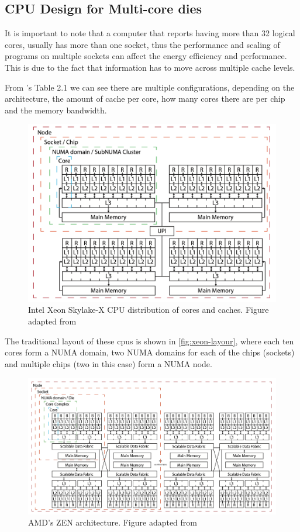 \subsection{CPU Design for Multi-core dies}
It is important to note that a computer that reports having more than 32 logical cores, usually has more than one socket, thus the performance and scaling of programs on multiple sockets can affect the energy efficiency and performance. This is due to the fact that information has to move across multiple cache levels.

From \cite{phd-apmtrlk}'s Table 2.1 we can see there are multiple configurations, depending on the architecture, the amount of cache per core, how many cores there are per chip and the memory bandwidth.


\begin{figure}
    \centering
    \includegraphics[width=0.75\linewidth]{img/xeon-architecture.png}
    \caption{Intel Xeon Skylake-X CPU distribution of cores and caches. Figure adapted from \autocite{phd-apmtrlk}}
    \label{fig:xeon-layour}
\end{figure}

The traditional layout of these \glspl{cpu} is shown in \autoref{fig:xeon-layour}, where each ten cores form a \gls{NUMA} domain, two \gls{NUMA} domains for each of the chips (sockets) and multiple chips (two in this case) form a \gls{NUMA} node.


\begin{figure}
    \centering
    \includegraphics[width=0.85\linewidth]{img/ccx-zen2-layout.png}
    \caption{AMD's ZEN architecture. Figure adapted from \autocite{phd-apmtrlk}}
    \label{fig:zen2-architecture}
\end{figure}

